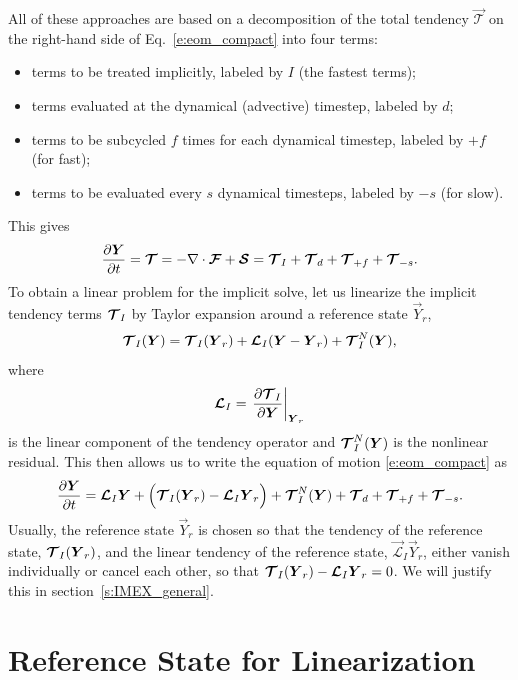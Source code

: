 \documentclass{report}
\numberwithin{equation}{section}
\begin{document}
All of these approaches are based on a decomposition of the total tendency $\vec{\mathcal{T}}$ on the right-hand side of Eq.~\eqref{e:eom_compact} into four terms: 
\begin{itemize}
    \item terms to be treated implicitly, labeled by $I$ (the fastest terms);
    \item terms evaluated at the dynamical (advective) timestep, labeled by $d$;
    \item terms to be subcycled $f$ times for each dynamical timestep, labeled by $+f$ (for fast);
    \item terms to be evaluated every $s$ dynamical timesteps, labeled by $-s$ (for slow).
\end{itemize}
This gives
\[
\frac{\partial \boldsymbol{{Y}}}{\partial t} = \boldsymbol{{\mathcal{T}}} = - \nabla \cdot \boldsymbol{{\mathcal{F}}} + \boldsymbol{{\mathcal{S}}} = \boldsymbol{{\mathcal{T}}}_{I} + \boldsymbol{{\mathcal{T}}}_{d} + \boldsymbol{{\mathcal{T}}}_{+f} + \boldsymbol{{\mathcal{T}}}_{-s}.
\]
To obtain a linear problem for the implicit solve, let us linearize the implicit tendency terms $\boldsymbol{{\mathcal{T}}}_{I}$ by Taylor expansion around a reference state $\vec{Y}_r$,
\begin{equation}\label{e:imex_linearization}
\boldsymbol{{\mathcal{T}}}_{I}(\boldsymbol{{Y}}) =  \boldsymbol{{\mathcal{T}}}_I(\boldsymbol{{Y}}_r) + \boldsymbol{{\mathcal{L}}}_I (\boldsymbol{{Y}} - \boldsymbol{{Y}}_r) + \boldsymbol{{\mathcal{T}}}^N_{I}(\boldsymbol{{Y}}),
\end{equation}
where 
\begin{equation}
    \boldsymbol{{\mathcal{L}}}_I = \left. \frac{\partial\boldsymbol{{\mathcal{T}}}_I}{\partial\boldsymbol{{Y}}}\right|_{\boldsymbol{{Y}}_r}
\end{equation} 
is the linear component of the tendency operator and $\boldsymbol{{\mathcal{T}}}^N_{I}(\boldsymbol{{Y}})$ is the nonlinear residual. This then allows us to write the equation of motion \eqref{e:eom_compact} as
\begin{equation}
\label{eq:IMEX}
\frac{\partial\boldsymbol{{Y}}}{\partial t} =  \boldsymbol{{\mathcal{L}}}_I \boldsymbol{{Y}} + \Bigl(\boldsymbol{{\mathcal{T}}}_I(\boldsymbol{{Y}}_r) - \boldsymbol{{\mathcal{L}}}_I \boldsymbol{{Y}}_r\Bigr) + \boldsymbol{{\mathcal{T}}}^N_{I}(\boldsymbol{{Y}}) + \boldsymbol{{\mathcal{T}}}_{d} + \boldsymbol{{\mathcal{T}}}_{+f} + \boldsymbol{{\mathcal{T}}}_{-s}.
\end{equation}
Usually, the reference state $\vec{Y}_r$ is chosen so that the tendency of the reference state, $\boldsymbol{{\mathcal{T}}}_I(\boldsymbol{{Y}}_r)$, and the linear tendency of the reference state, $\vec{\mathcal{L}}_I \vec{Y}_r$, either vanish individually or cancel each other, so that $\boldsymbol{{\mathcal{T}}}_I(\boldsymbol{{Y}}_r) - \boldsymbol{{\mathcal{L}}}_I \boldsymbol{{Y}}_r=0$. We will justify this in section~\ref{s:IMEX_general}.

\section{Reference State for Linearization}
\end{document}

